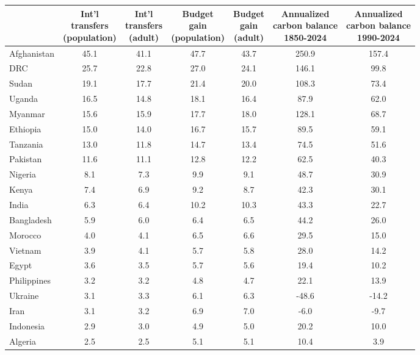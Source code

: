 
\begin{tabular}[t]{lcccccc}
\toprule
  & \makecell{Int'l\\transfers\\(population)} & \makecell{Int'l\\transfers\\(adult)} & \makecell{Budget\\gain\\(population)} & \makecell{Budget\\gain\\(adult)} & \makecell{Annualized\\carbon balance\\1850-2024} & \makecell{Annualized\\carbon balance\\1990-2024}\\
\midrule
Afghanistan & 45.1 & 41.1 & 47.7 & 43.7 & 250.9 & 157.4\\
DRC & 25.7 & 22.8 & 27.0 & 24.1 & 146.1 & 99.8\\
Sudan & 19.1 & 17.7 & 21.4 & 20.0 & 108.3 & 73.4\\
Uganda & 16.5 & 14.8 & 18.1 & 16.4 & 87.9 & 62.0\\
Myanmar & 15.6 & 15.9 & 17.7 & 18.0 & 128.1 & 68.7\\
Ethiopia & 15.0 & 14.0 & 16.7 & 15.7 & 89.5 & 59.1\\
Tanzania & 13.0 & 11.8 & 14.7 & 13.4 & 74.5 & 51.6\\
Pakistan & 11.6 & 11.1 & 12.8 & 12.2 & 62.5 & 40.3\\
Nigeria & 8.1 & 7.3 & 9.9 & 9.1 & 48.7 & 30.9\\
Kenya & 7.4 & 6.9 & 9.2 & 8.7 & 42.3 & 30.1\\
India & 6.3 & 6.4 & 10.2 & 10.3 & 43.3 & 22.7\\
Bangladesh & 5.9 & 6.0 & 6.4 & 6.5 & 44.2 & 26.0\\
Morocco & 4.0 & 4.1 & 6.5 & 6.6 & 29.5 & 15.0\\
Vietnam & 3.9 & 4.1 & 5.7 & 5.8 & 28.0 & 14.2\\
Egypt & 3.6 & 3.5 & 5.7 & 5.6 & 19.4 & 10.2\\
Philippines & 3.2 & 3.2 & 4.8 & 4.7 & 22.1 & 13.9\\
Ukraine & 3.1 & 3.3 & 6.1 & 6.3 & -48.6 & -14.2\\
Iran & 3.1 & 3.2 & 6.9 & 7.0 & -6.0 & -9.7\\
Indonesia & 2.9 & 3.0 & 4.9 & 5.0 & 20.2 & 10.0\\
Algeria & 2.5 & 2.5 & 5.1 & 5.1 & 10.4 & 3.9\\

\end{tabular}
